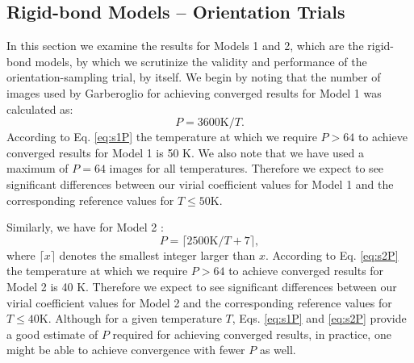         \subsection{Rigid-bond Models -- Orientation Trials}
            In this section we examine the results for Models 1 and 2, which are the rigid-bond models, by which we scrutinize the validity and performance of the orientation-sampling trial, by itself. We begin by noting that the number of images used by Garberoglio for achieving converged results \cite{Patkowski2008} for Model 1 was calculated as:
            \begin{equation}
            \label{eq:s1P}
                P = 3600 \textrm{K}/T.
            \end{equation}
According to Eq. \eqref{eq:s1P} the temperature at which we require $P > 64$ to achieve converged results for Model 1 is 50 K. We also note that we have used a maximum of $P = 64$ images for all temperatures. Therefore we expect to see significant differences between our virial coefficient values for Model 1 and the corresponding reference values for $T \le 50 $K.

            Similarly, we have for Model 2 \cite{Garberoglio2012}:
            \begin{equation}
            \label{eq:s2P}
                P = \lceil 2500 \textrm{K}/T + 7 \rceil,
            \end{equation}
            where $\lceil x \rceil$ denotes the smallest integer larger than $x$.
According to Eq. \eqref{eq:s2P} the temperature at which we require $P > 64$ to achieve converged results for Model 2 is 40 K. Therefore we expect to see significant differences between our virial coefficient values for Model 2 and the corresponding reference values for $T \le 40 $K. Although for a given temperature $T$, Eqs. \eqref{eq:s1P} and \eqref{eq:s2P} provide a good estimate of $P$ required for achieving converged results, in practice, one might be able to achieve convergence with fewer $P$ as well.

